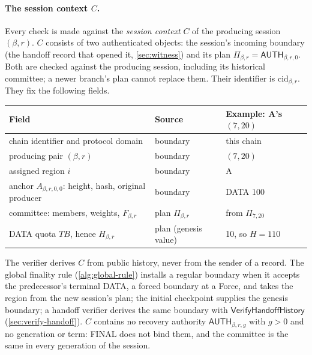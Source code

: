 \documentclass[11pt,a4paper]{article}
\newcommand{\TB}{\mathit{TB}}
\newcommand{\tagg}[1]{\ensuremath{\mathsf{#1}}}
\newcommand{\defterm}[1]{\textcolor{rrBlue}{\textit{#1}}}
\newcounter{protocol}
\begin{document}
\paragraph{The session context $C$.}
Every check is made against the \defterm{session context} $C$ of the
producing session $(\beta,r)$. $C$ consists of two authenticated
objects: the session's incoming boundary (the handoff record that opened
it, \cref{sec:witness}) and its plan $\Pi_{\beta,r}=\tagg{AUTH}_{\beta,r,0}$.
Both are checked against the producing session, including its historical
committee; a newer branch's plan cannot replace them. Their identifier is
$\mathrm{cid}_{\beta,r}$. They fix the following fields.
\begin{center}\small
\begin{tabularx}{\linewidth}{@{}>{\raggedright\arraybackslash}p{.36\linewidth}>{\raggedright\arraybackslash}p{.2\linewidth}Y@{}}\toprule
Field & Source & Example: A's $(7,20)$\\\midrule
chain identifier and protocol domain & boundary & this chain\\
producing pair $(\beta,r)$ & boundary & $(7,20)$\\
assigned region $i$ & boundary & A\\
anchor $A_{\beta,r,0,0}$: height, hash, original producer & boundary & DATA 100\\
committee: members, weights, $F_{\beta,r}$ & plan $\Pi_{\beta,r}$ & from $\Pi_{7,20}$\\
DATA quota $\TB$, hence $H_{\beta,r}$ & plan (genesis value) & 10, so $H=110$\\\bottomrule
\end{tabularx}
\end{center}
The verifier derives $C$ from public history, never from the sender of a
record. The global finality rule (\cref{alg:global-rule}) installs a
regular boundary when it accepts the predecessor's terminal DATA, a
forced boundary at a Force, and takes the region from the new session's
plan; the initial checkpoint supplies the genesis boundary; a handoff
verifier derives the same boundary with $\tagg{VerifyHandoffHistory}$
(\cref{sec:verify-handoff}). $C$ contains no recovery authority
$\tagg{AUTH}_{\beta,r,g}$ with $g>0$ and no generation or term: FINAL does not
bind them, and the committee is the same in every generation of the
session.
\end{document}
